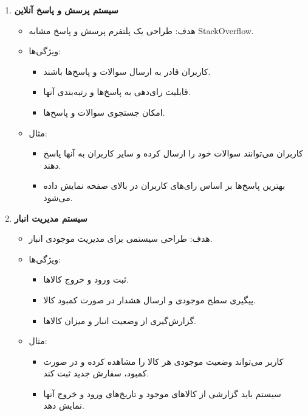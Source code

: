 \documentclass[b5paper,12pt]{article}
\begin{document}
\begin{enumerate}
			\item \textbf{سیستم پرسش و پاسخ آنلاین}
			\begin{itemize}
				\item هدف: طراحی یک پلتفرم پرسش و پاسخ مشابه StackOverflow.
				\item ویژگی‌ها:
				\begin{itemize}
					\item کاربران قادر به ارسال سوالات و پاسخ‌ها باشند.
					\item قابلیت رای‌دهی به پاسخ‌ها و رتبه‌بندی آنها.
					\item امکان جستجوی سوالات و پاسخ‌ها.
				\end{itemize}
				\item مثال:
				\begin{itemize}
					\item کاربران می‌توانند سوالات خود را ارسال کرده و سایر کاربران به آنها پاسخ دهند.
					\item بهترین پاسخ‌ها بر اساس رای‌های کاربران در بالای صفحه نمایش داده می‌شود.
				\end{itemize}
			\end{itemize}
			
			\item \textbf{سیستم مدیریت انبار}
			\begin{itemize}
				\item هدف: طراحی سیستمی برای مدیریت موجودی انبار.
				\item ویژگی‌ها:
				\begin{itemize}
					\item ثبت ورود و خروج کالاها.
					\item پیگیری سطح موجودی و ارسال هشدار در صورت کمبود کالا.
					\item گزارش‌گیری از وضعیت انبار و میزان کالاها.
				\end{itemize}
				\item مثال:
				\begin{itemize}
					\item کاربر می‌تواند وضعیت موجودی هر کالا را مشاهده کرده و در صورت کمبود، سفارش جدید ثبت کند.
					\item سیستم باید گزارشی از کالاهای موجود و تاریخ‌های ورود و خروج آنها نمایش دهد.
				\end{itemize}
			\end{itemize}
			

\end{enumerate}
\end{document}
